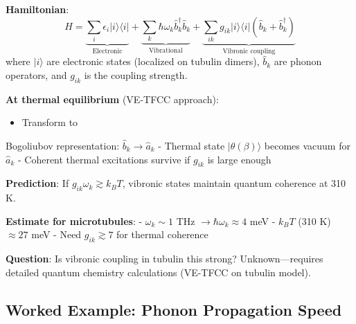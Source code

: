 \textbf{Hamiltonian}:
\[\hat{H} = \underbrace{\sum_i \epsilon_i | i \rangle \langle i |}_{\text{Electronic}} + \underbrace{\sum_k \hbar \omega_k \hat{b}_k^\dagger \hat{b}_k}_{\text{Vibrational}} + \underbrace{\sum_{ik} g_{ik} | i \rangle \langle i | (\hat{b}_k + \hat{b}_k^\dagger)}_{\text{Vibronic coupling}}\]
where \(| i \rangle\) are electronic states (localized on tubulin
dimers), \(\hat{b}_k\) are phonon operators, and \(g_{ik}\) is the
coupling strength.

\textbf{At thermal equilibrium} (VE-TFCC approach):
\begin{itemize}
\item Transform to
\end{itemize}

Bogoliubov representation: \(\hat{b}_k \rightarrow \hat{a}_k\) - Thermal
state \(|\theta(\beta)\rangle\) becomes vacuum for \(\hat{a}_k\) -
Coherent thermal excitations survive if \(g_{ik}\) is large enough

\textbf{Prediction}: If \(g_{ik} \omega_k \gtrsim k_B T\), vibronic
states maintain quantum coherence at 310 K.

\textbf{Estimate for microtubules}: - \(\omega_k \sim 1\) THz
\(\rightarrow \hbar \omega_k \approx 4\) meV - \(k_B T\) (310 K)
\(\approx 27\) meV - Need \(g_{ik} \gtrsim 7\) for thermal coherence

\textbf{Question}: Is vibronic coupling in tubulin this strong?
Unknown---requires detailed quantum chemistry calculations (VE-TFCC
on tubulin model).


\subsection{Worked Example: Phonon Propagation Speed}
\label{subsec:worked-example}

